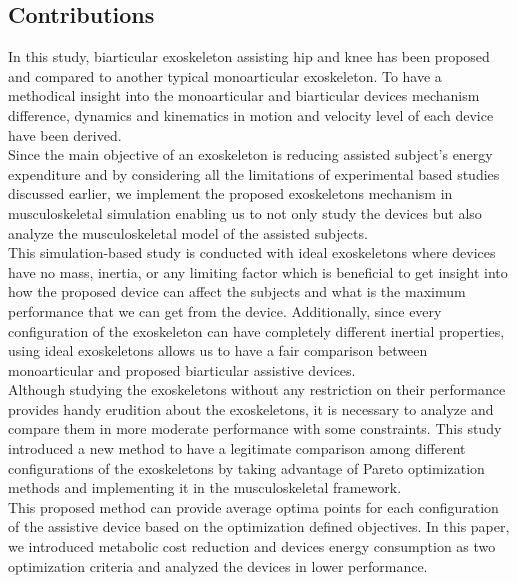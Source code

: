 \documentclass[10pt,letterpaper]{article}
\begin{document}
\subsection*{Contributions}
In this study, biarticular exoskeleton assisting hip and knee has been proposed and compared to another typical monoarticular exoskeleton. To have a methodical insight into the monoarticular and biarticular devices mechanism difference, dynamics and kinematics in motion and velocity level of each device have been derived.\\
Since the main objective of an exoskeleton is reducing assisted subject's energy expenditure and by considering all the limitations of experimental based studies discussed earlier, we implement the proposed exoskeletons mechanism in musculoskeletal simulation enabling us to not only study the devices but also analyze the musculoskeletal model of the assisted subjects.\\
This simulation-based study is conducted with ideal exoskeletons where devices have no mass, inertia, or any limiting factor which is beneficial to get insight into how the proposed device can affect the subjects and what is the maximum performance that we can get from the device. Additionally, since every configuration of the exoskeleton can have completely different inertial properties, using ideal exoskeletons allows us to have a fair comparison between monoarticular and proposed biarticular assistive devices.\\
Although studying the exoskeletons without any restriction on their performance provides handy erudition about the exoskeletons, it is necessary to analyze and compare them in more moderate performance with some constraints. This study introduced a new method to have a legitimate comparison among different configurations of the exoskeletons by taking advantage of Pareto optimization methods and implementing it in the musculoskeletal framework.\\
This proposed method can provide average optima points for each configuration of the assistive device based on the optimization defined objectives. In this paper, we introduced metabolic cost reduction and devices energy consumption as two optimization criteria and analyzed the devices in lower performance.\\
\end{document}

